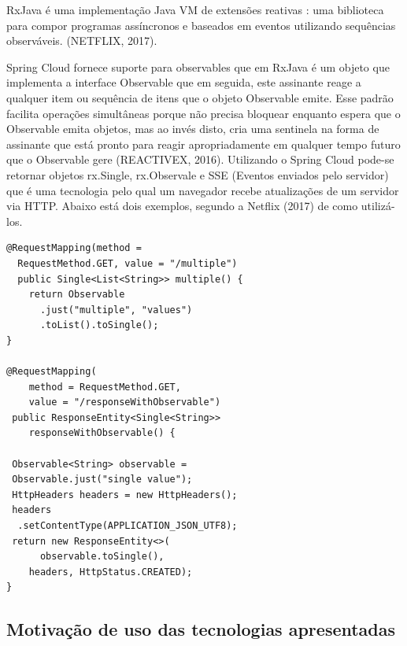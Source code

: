 \documentclass[journal]{IEEEtran}
\begin{document}
RxJava é uma implementação Java VM de extensões reativas : uma biblioteca para compor programas assíncronos e baseados em eventos utilizando sequências observáveis. (NETFLIX, 2017).

Spring Cloud fornece suporte para observables que em RxJava é um objeto que implementa a interface Observable que em seguida, este assinante reage a qualquer item ou sequência de itens que o objeto Observable emite. Esse padrão facilita operações simultâneas porque não precisa bloquear enquanto espera que o Observable emita objetos, mas ao invés disto, cria uma sentinela na forma de assinante que está pronto para reagir apropriadamente em qualquer tempo futuro que o Observable gere (REACTIVEX, 2016). Utilizando o Spring Cloud pode-se retornar objetos rx.Single, rx.Observale e SSE (Eventos enviados pelo servidor) que é uma tecnologia pelo qual um navegador recebe atualizações de um servidor via HTTP. Abaixo está dois exemplos, segundo a Netflix (2017) de como utilizá-los.

\begin{verbatim}
@RequestMapping(method =
  RequestMethod.GET, value = "/multiple")
  public Single<List<String>> multiple() {
    return Observable
      .just("multiple", "values")
      .toList().toSingle();
}

@RequestMapping(
    method = RequestMethod.GET, 
    value = "/responseWithObservable")
 public ResponseEntity<Single<String>> 
    responseWithObservable() {

 Observable<String> observable = 
 Observable.just("single value");
 HttpHeaders headers = new HttpHeaders();
 headers
  .setContentType(APPLICATION_JSON_UTF8);
 return new ResponseEntity<>(
      observable.toSingle(), 
    headers, HttpStatus.CREATED);
}
\end{verbatim}

\subsection{Motivação de uso das tecnologias apresentadas}
\end{document}
